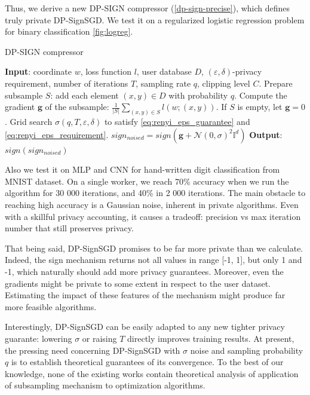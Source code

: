 \documentclass[a4paper, 12pt]{article}
\newcommand{\eps}{\varepsilon}
\begin{document}
Thus, we derive a new DP-SIGN compressor (\cref{dp-sign-precise}), which defines truly private DP-SignSGD. We test it on a regularized logistic regression problem for binary classification \cref{fig:logreg}.


\newcommand{\gradg}{\boldsymbol{g}}
\begin{algorithm}
    \caption{DP-SIGN compressor}
    \label{dp-sign-precise}
    \begin{algorithmic}
        \STATE \textbf{Input}: coordinate $w$, loss function $l$, user database $D$, $(\eps, \delta)$-privacy requirement, number of iterations $T$, sampling rate $q$, clipping level $C$.
        \STATE Prepare subsample $S$: add each element $(x, y) \in D$ with probability $q$.
        \STATE Compute the gradient $\gradg$ of the subsample: $\frac{1}{|S|}\sum_{(x,y)\in S}l(w;(x,y))$. If $S$ is empty, let $\gradg = 0$.
        \STATE Grid search $\sigma(q, T, \eps, \delta)$ to satisfy \eqref{eq:renyi_eps_guarantee} and \eqref{eq:renyi_eps_requirement}.
        \STATE $sign_{noised} = sign(\gradg + \mathcal{N}(0,\sigma)^2\mathbb{I}^d)$
        \STATE \textbf{Output}: $sign(sign_{noised})$
    \end{algorithmic}
\end{algorithm}

Also we test it on MLP and CNN for hand-written digit classification from MNIST dataset. On a single worker, we reach 70\% accuracy when we run the algorithm for 30 000 iterations, and 40\% in 2 000 iterations. The main obstacle to reaching high accuracy is a Gaussian noise, inherent in private algorithms. Even with a skillful privacy accounting, it causes a tradeoff: precision vs max iteration number that still preserves privacy.

That being said, DP-SignSGD promises to be far more private than we calculate. Indeed, the sign mechanism returns not all values in range [-1, 1], but only 1 and -1, which naturally should add more privacy guarantees. Moreover, even the gradients might be private to some extent in respect to the user dataset. Estimating the impact of these features of the mechanism might produce far more feasible algorithms.

Interestingly, DP-SignSGD can be easily adapted to any new tighter privacy guarante: lowering $\sigma$ or raising $T$ directly improves training results. At present, the pressing need concerning DP-SignSGD with $\sigma$ noise and sampling probability $q$ is to establish theoretical guarantees of its convergence. To the best of our knowledge, none of the existing works contain theoretical analysis of application of subsampling mechanism to optimization algorithms.

\vspace{-2em}
\printbibliography[heading=bibliography]
\end{document}

